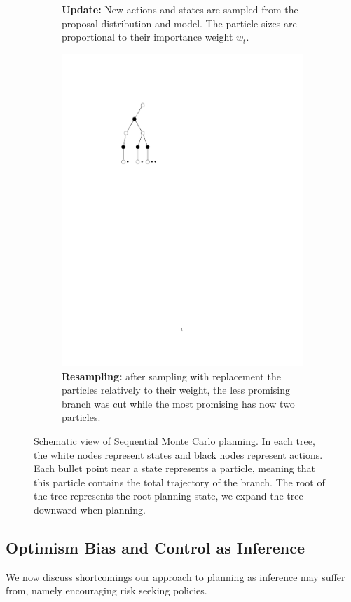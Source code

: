 \begin{figure}[h!]
\begin{subfigure}{.30\textwidth}
  \caption{\textbf{Update:} New actions and states are sampled from the proposal distribution and model. The particle sizes are proportional to their importance weight $w_t$.  \vspace{3.5em} } %
  \label{fig:sub2}
\end{subfigure}\hspace{.03\linewidth}
\begin{subfigure}{.30\textwidth}
  \centering
  \includegraphics[width=0.7\linewidth, trim={5cm 17cm 12cm 4cm},clip]{articles/smcp/figures/main_ts5.pdf}
  \caption{\textbf{Resampling:} after sampling with replacement the particles relatively to their weight, the less promising branch was cut while the most promising has now two particles.\vspace{3em}}
  \label{fig:sub3}
\end{subfigure}
\caption{Schematic view of Sequential Monte Carlo planning. In each tree, the white nodes represent states and black nodes represent actions. Each bullet point near a state represents a particle, meaning that this particle contains the total trajectory of the branch. The root of the tree represents the root planning state, we expand the tree downward when planning.}
\label{fig:tree}
\end{figure}

\subsection{Optimism Bias and Control as Inference}
We now discuss shortcomings our approach to planning as inference may suffer from, namely encouraging risk seeking policies.


